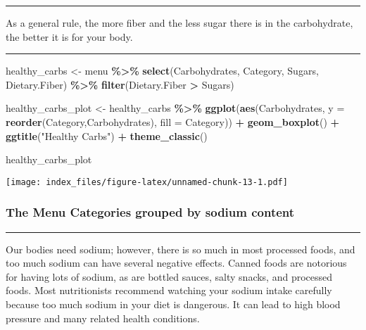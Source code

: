 \documentclass[
]{article}
\newenvironment{Shaded}{\begin{snugshade}}{\end{snugshade}}
\newcommand{\AttributeTok}[1]{\textcolor[rgb]{0.13,0.29,0.53}{#1}}
\newcommand{\FunctionTok}[1]{\textcolor[rgb]{0.13,0.29,0.53}{\textbf{#1}}}
\newcommand{\NormalTok}[1]{#1}
\newcommand{\OtherTok}[1]{\textcolor[rgb]{0.56,0.35,0.01}{#1}}
\newcommand{\SpecialCharTok}[1]{\textcolor[rgb]{0.81,0.36,0.00}{\textbf{#1}}}
\newcommand{\StringTok}[1]{\textcolor[rgb]{0.31,0.60,0.02}{#1}}
\begin{document}
\begin{center}\rule{0.5\linewidth}{0.5pt}\end{center}

As a general rule, the more fiber and the less sugar there is in the
carbohydrate, the better it is for your body.

\begin{center}\rule{0.5\linewidth}{0.5pt}\end{center}

\begin{Shaded}
\begin{Highlighting}[]
\NormalTok{healthy\_carbs }\OtherTok{\textless{}{-}}\NormalTok{  menu }\SpecialCharTok{\%\textgreater{}\%} 
  \FunctionTok{select}\NormalTok{(Carbohydrates,}
\NormalTok{         Category,}
\NormalTok{         Sugars,}
\NormalTok{         Dietary.Fiber)  }\SpecialCharTok{\%\textgreater{}\%}  
  \FunctionTok{filter}\NormalTok{(Dietary.Fiber }\SpecialCharTok{\textgreater{}}\NormalTok{ Sugars)}

\NormalTok{healthy\_carbs\_plot }\OtherTok{\textless{}{-}}\NormalTok{ healthy\_carbs }\SpecialCharTok{\%\textgreater{}\%} 
  \FunctionTok{ggplot}\NormalTok{(}\FunctionTok{aes}\NormalTok{(Carbohydrates,}
             \AttributeTok{y =} \FunctionTok{reorder}\NormalTok{(Category,Carbohydrates),}
             \AttributeTok{fill =}\NormalTok{ Category)) }\SpecialCharTok{+}
  \FunctionTok{geom\_boxplot}\NormalTok{() }\SpecialCharTok{+} \FunctionTok{ggtitle}\NormalTok{(}\StringTok{"Healthy Carbs"}\NormalTok{) }\SpecialCharTok{+} \FunctionTok{theme\_classic}\NormalTok{()}



\NormalTok{healthy\_carbs\_plot}
\end{Highlighting}
\end{Shaded}

\texttt{[image: index\_files/figure-latex/unnamed-chunk-13-1.pdf]}

\hypertarget{the-menu-categories-grouped-by-sodium-content}{%
\subsubsection{The Menu Categories grouped by sodium
content}\label{the-menu-categories-grouped-by-sodium-content}}

\begin{center}\rule{0.5\linewidth}{0.5pt}\end{center}

Our bodies need sodium; however, there is so much in most processed
foods, and too much sodium can have several negative effects. Canned
foods are notorious for having lots of sodium, as are bottled sauces,
salty snacks, and processed foods. Most nutritionists recommend watching
your sodium intake carefully because too much sodium in your diet is
dangerous. It can lead to high blood pressure and many related health
conditions.
\end{document}

